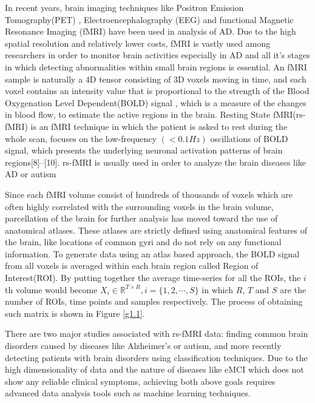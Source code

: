 \documentclass[journal]{IEEEtran}
\begin{document}
	
	In recent years, brain imaging techniques like Positron Emission Tomography(PET) \cite{r21}, Electroencephalography (EEG)\cite{r22} and functional Magnetic Resonance Imaging (fMRI)\cite{r23} have been used in analysis of AD. Due to the high spatial resolution and relatively lower costs, fMRI is vastly used among researchers in order to monitor brain activities especially in AD and all it's stages in which detecting abnormalities within small brain regions is essential. 
	An fMRI sample is naturally a 4D tensor consisting of 3D voxels moving in time, and each voxel contains an intensity value that is proportional to the strength of the Blood Oxygenation Level Dependent(BOLD) signal , which is a measure of the changes in blood flow, to estimate the active regions in the brain\cite{r07}.
	Resting State fMRI(rs-fMRI) is an fMRI technique in which the patient is asked to rest during the whole scan, focuses on the low-frequency $\left( < 0.1 Hz \right)$  oscillations of BOLD signal, which presents the underlying neuronal activation patterns of brain regions[8]–[10]. rs-fMRI is usually used in order to analyze the brain diseases like AD or autism\cite{r33,r34}
%

Since each fMRI volume consist of hundreds of thousands of voxels which are often highly correlated with the surrounding voxels in the brain volume, parcellation of the brain for further analysis has moved toward the use
of anatomical atlases. These atlases are strictly defined using
anatomical features of the brain, like locations of common gyri
and do not rely on any functional information.
To generate data
using an atlas based approach, the BOLD signal from all voxels is averaged within each brain region called Region of Interest(ROI)\cite{r09}.
By putting together the average time-series for all the ROIs, the $i$th volume would become $X_i \in \mathbb{R}^{T \times R} , i = \{1,2,\cdots, S\}$ in which $R$, $T$ and $S$ are the number of ROIs, time points and samples respectively. The process of obtaining such matrix is shown in Figure \eqref{g1.1}. 

There are two major studies associated with rs-fMRI data: finding common brain disorders caused by diseases like Alzheimer's or autism, and more recently detecting patients with brain disorders using classification techniques. Due to the high dimensionality of data and the nature of diseases like eMCI which does not show any reliable clinical symptoms, achieving both above goals requires advanced data analysis tools such as machine learning techniques. 
\end{document}

